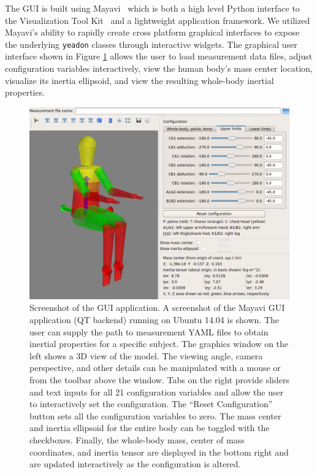 \documentclass[10pt,a4paper,twocolumn]{article}
\begin{document}
The GUI is built using Mayavi~\cite{Ramachandran2011} which is both a high
level Python interface to the Visualization Tool Kit~\cite{Schroeder2006} and
a lightweight application framework. We utilized Mayavi's ability to rapidly
create cross platform graphical interfaces to expose the underlying
\verb+yeadon+ classes through interactive widgets. The graphical user
interface shown in Figure \ref{fig:gui} allows the user to load measurement
data files, adjust configuration variables interactively, view the human body's
mass center location, visualize its inertia ellipsoid, and view the resulting
whole-body inertial properties.

\begin{figure}
  \begin{center}
    \includegraphics{figures/gui-screenshot.png}
  \end{center}
  \caption{
    Screenshot of the GUI application. A screenshot of the Mayavi GUI
    application (QT backend) running on Ubuntu 14.04 is shown. The user can
    supply the path to measurement YAML files to obtain inertial properties for a specific subject. The graphics window on the left shows a 3D view of the
    model. The viewing angle, camera perspective, and other details can be
    manipulated with a mouse or from the toolbar above the window. Tabs
    on the right provide sliders and text inputs for all 21 configuration
    variables and allow the user to interactively set the configuration. The
    ``Reset Configuration'' button sets all the configuration variables to
    zero. The mass center and inertia ellipsoid for the entire body can be
    toggled with the checkboxes. Finally, the whole-body mass, center of mass coordinates, and
    inertia tensor are displayed in the bottom right and are updated interactively
    as the configuration is altered.
  }
  \label{fig:gui}
\end{figure}
\end{document}
